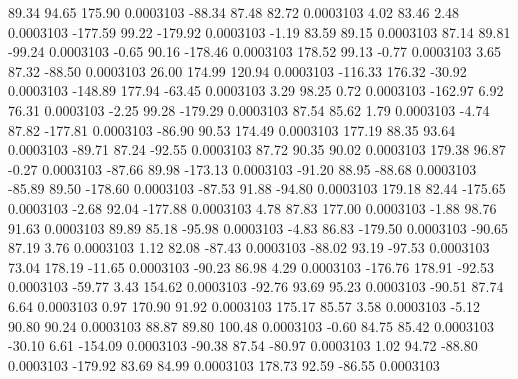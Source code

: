        89.34       94.65      175.90     0.0003103
      -88.34       87.48       82.72     0.0003103
        4.02       83.46        2.48     0.0003103
     -177.59       99.22     -179.92     0.0003103
       -1.19       83.59       89.15     0.0003103
       87.14       89.81      -99.24     0.0003103
       -0.65       90.16     -178.46     0.0003103
      178.52       99.13       -0.77     0.0003103
        3.65       87.32      -88.50     0.0003103
       26.00      174.99      120.94     0.0003103
     -116.33      176.32      -30.92     0.0003103
     -148.89      177.94      -63.45     0.0003103
        3.29       98.25        0.72     0.0003103
     -162.97        6.92       76.31     0.0003103
       -2.25       99.28     -179.29     0.0003103
       87.54       85.62        1.79     0.0003103
       -4.74       87.82     -177.81     0.0003103
      -86.90       90.53      174.49     0.0003103
      177.19       88.35       93.64     0.0003103
      -89.71       87.24      -92.55     0.0003103
       87.72       90.35       90.02     0.0003103
      179.38       96.87       -0.27     0.0003103
      -87.66       89.98     -173.13     0.0003103
      -91.20       88.95      -88.68     0.0003103
      -85.89       89.50     -178.60     0.0003103
      -87.53       91.88      -94.80     0.0003103
      179.18       82.44     -175.65     0.0003103
       -2.68       92.04     -177.88     0.0003103
        4.78       87.83      177.00     0.0003103
       -1.88       98.76       91.63     0.0003103
       89.89       85.18      -95.98     0.0003103
       -4.83       86.83     -179.50     0.0003103
      -90.65       87.19        3.76     0.0003103
        1.12       82.08      -87.43     0.0003103
      -88.02       93.19      -97.53     0.0003103
       73.04      178.19      -11.65     0.0003103
      -90.23       86.98        4.29     0.0003103
     -176.76      178.91      -92.53     0.0003103
      -59.77        3.43      154.62     0.0003103
      -92.76       93.69       95.23     0.0003103
      -90.51       87.74        6.64     0.0003103
        0.97      170.90       91.92     0.0003103
      175.17       85.57        3.58     0.0003103
       -5.12       90.80       90.24     0.0003103
       88.87       89.80      100.48     0.0003103
       -0.60       84.75       85.42     0.0003103
      -30.10        6.61     -154.09     0.0003103
      -90.38       87.54      -80.97     0.0003103
        1.02       94.72      -88.80     0.0003103
     -179.92       83.69       84.99     0.0003103
      178.73       92.59      -86.55     0.0003103
